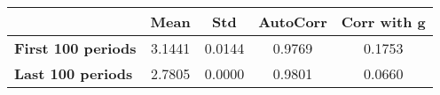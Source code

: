 \begin{tiny}\begin{tabular}{|l|c|c|c|c|}
\hline
&\textbf{Mean}&\textbf{Std}&\textbf{AutoCorr}&\textbf{Corr with g}\\\hline
\textbf{First 100 periods}&3.1441&0.0144&0.9769&0.1753\\\hline
\textbf{Last 100 periods}&2.7805&0.0000&0.9801&0.0660\\\hline
\end{tabular}
\end{tiny}